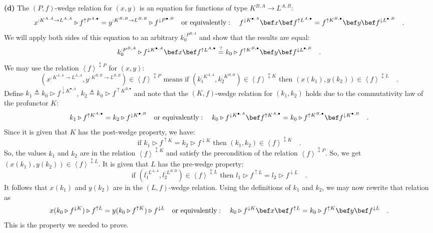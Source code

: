 \textbf{(d)} The $\left(P,f\right)$-wedge relation for $(x,y)$ is
an equation for functions of type $K^{B,A}\rightarrow L^{A,B}$:
\[
x^{:K^{A,A}\rightarrow L^{A,A}}\triangleright f^{\uparrow P^{A,\bullet}}=y^{:K^{B,B}\rightarrow L^{B,B}}\triangleright f^{\downarrow P^{\bullet,B}}\quad\text{or equivalently}:\quad f^{\downarrow K^{\bullet,A}}\bef x\bef f^{\uparrow L^{A,\bullet}}=f^{\uparrow K^{B,\bullet}}\bef y\bef f^{\downarrow L^{\bullet,B}}\quad.
\]
We will apply both sides of this equation to an arbitrary $k_{0}^{:P^{B,A}}$
and show that the results are equal:
\[
k_{0}^{:P^{B,A}}\triangleright f^{\downarrow K^{\bullet,A}}\bef x\bef f^{\uparrow L^{A,\bullet}}\overset{?}{=}k_{0}\triangleright f^{\uparrow K^{B,\bullet}}\bef y\bef f^{\downarrow L^{\bullet,B}}\quad.
\]
We may use the relation $\left<f\right>^{\updownarrow P}$ for $(x,y)$:
\[
(x^{:K^{A,A}\rightarrow L^{A,A}},y^{:K^{B,B}\rightarrow L^{B,B}})\in\left<f\right>^{\updownarrow P}\text{ means if }(k_{1}^{:K^{A,A}},k_{2}^{:K^{B,B}})\in\left<f\right>^{\updownarrow K}\text{ then }(x(k_{1}),y(k_{2}))\in\left<f\right>^{\updownarrow L}\quad.
\]
Define $k_{1}\triangleq k_{0}\triangleright f^{\downarrow K^{\bullet,A}}$,
$k_{2}\triangleq k_{0}\triangleright f^{\uparrow K^{B,\bullet}}$
and note that the $\left(K,f\right)$-wedge relation for $(k_{1},k_{2})$
holds due to the commutativity law of the profunctor $K$:
\[
k_{1}\triangleright f^{\uparrow K^{A,\bullet}}=k_{2}\triangleright f^{\downarrow K^{\bullet,B}}\quad\text{or equivalently}:\quad k_{0}\triangleright f^{\downarrow K^{\bullet,A}}\bef f^{\uparrow K^{A,\bullet}}=k_{0}\triangleright f^{\uparrow K^{B,\bullet}}\bef f^{\downarrow K^{\bullet,B}}\quad.
\]
Since it is given that $K$ has the post-wedge property, we have:
\[
\text{if }k_{1}\triangleright f^{\uparrow K}=k_{2}\triangleright f^{\downarrow K}\text{ then }(k_{1},k_{2})\in\left<f\right>^{\updownarrow K}\quad.
\]
So, the values $k_{1}$ and $k_{2}$ are in the relation $\left<f\right>^{\updownarrow K}$
and satisfy the precondition of the relation $\left<f\right>^{\updownarrow P}$.
So, we get $(x(k_{1}),y(k_{2}))\in\left<f\right>^{\updownarrow L}$.
It is given that $L$ has the pre-wedge property:
\[
\text{if }(l_{1}^{:L^{A,A}},l_{2}^{:L^{B,B}})\in\left<f\right>^{\updownarrow L}\text{ then }l_{1}\triangleright f^{\uparrow L}=l_{2}\triangleright f^{\downarrow L}\quad.
\]
It follows that $x(k_{1})$ and $y(k_{2})$ are in the $\left(L,f\right)$-wedge
relation. Using the definitions of $k_{1}$ and $k_{2}$, we may now
rewrite that relation as
\[
x(k_{0}\triangleright f^{\downarrow K})\triangleright f^{\uparrow L}=y(k_{0}\triangleright f^{\uparrow K})\triangleright f^{\downarrow L}\quad\text{or equivalently}:\quad k_{0}\triangleright f^{\downarrow K}\bef x\bef f^{\uparrow L}=k_{0}\triangleright f^{\uparrow K}\bef y\bef f^{\downarrow L}\quad.
\]
This is the property we needed to prove.%
\begin{comment}
\textbf{(e)} The 

{*}{*}{*}
\end{comment}



